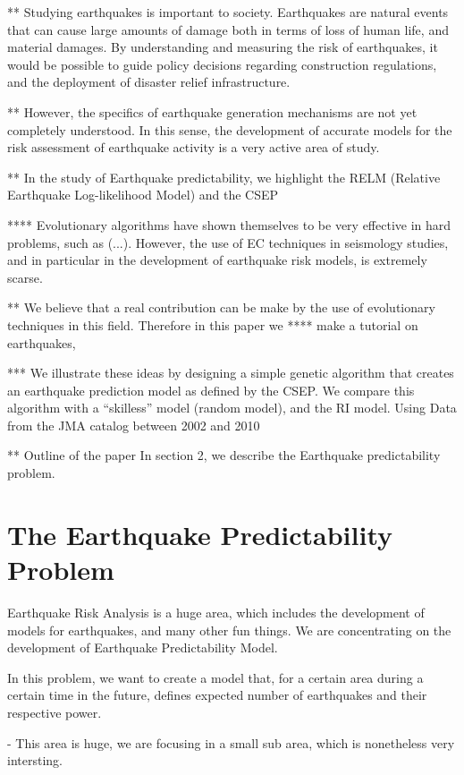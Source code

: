 \documentclass{sig-alternate}
\begin{document}
** Studying earthquakes is important to society. Earthquakes are
natural events that can cause large amounts of damage both in terms of
loss of human life, and material damages. By understanding and
measuring the risk of earthquakes, it would be possible to guide
policy decisions regarding construction regulations, and the
deployment of disaster relief infrastructure.

** However, the specifics of earthquake generation mechanisms are not
yet completely understood. In this sense, the development of accurate
models for the risk assessment of earthquake activity is a very active
area of study.

** In the study of Earthquake predictability, we highlight the RELM
(Relative Earthquake Log-likelihood Model) and the CSEP

**** Evolutionary algorithms have shown themselves to be very
effective in hard problems, such as (...). However, the use of EC
techniques in seismology studies, and in particular in the development
of earthquake risk models, is extremely scarse.

** We believe that a real contribution can be make by the use of
evolutionary techniques in this field. Therefore in this paper we ****
make a tutorial on earthquakes,

*** We illustrate these ideas by designing a simple genetic algorithm
that creates an earthquake prediction model as defined by the CSEP. We
compare this algorithm with a ``skilless'' model (random model), and
the RI model. Using Data from the JMA catalog between 2002 and 2010

** Outline of the paper
In section 2, we describe the Earthquake predictability problem.

\section{The Earthquake Predictability Problem}

Earthquake Risk Analysis is a huge area, which includes the
development of models for earthquakes, and many other fun things. We
are concentrating on the development of Earthquake Predictability
Model. 

In this problem, we want to create a model that, for a certain area
during a certain time in the future, defines expected number of
earthquakes and their respective power.

   - This area is huge, we are focusing in a small sub area, which is
   nonetheless very intersting.
\end{document}
